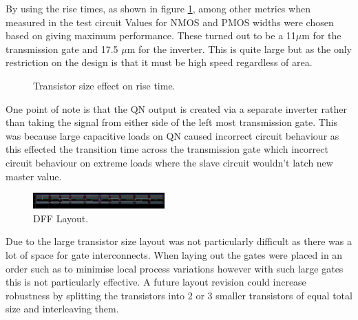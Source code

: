 By using the rise times, as shown in figure \ref{fig:DDFNW}, among other metrics when measured in the test circuit Values for NMOS and PMOS widths were chosen based on giving maximum performance. These turned out to be a 11$\mu$m for the transmission gate and 17.5 $\mu$m for the inverter. This is quite large but as the only restriction on the design is that it must be high speed regardless of area.

\begin{figure}[h]
\centering
{}
\caption{Transistor size effect on rise time.}
\label{fig:DDFNW}
\end{figure}

One point of note is that the QN output is created via a separate inverter rather than taking the signal from either side of the left most transmission gate. This was because large capacitive loads on QN caused incorrect circuit behaviour as this effected the transition time across the transmission gate which incorrect circuit behaviour on extreme loads where the slave circuit wouldn't latch new master value.

\begin{figure}[h]  
\centering
   \includegraphics[width=0.45\textwidth]{Figures/DFFLayout.png}
\caption{DFF Layout.}
\label {fig:DFFLayout}
\end{figure}

Due to the large transistor size layout was not particularly difficult as there was a lot of space for gate interconnects. When laying out the gates were placed in an order such as to minimise local process variations however with such large gates this is not particularly effective. A future layout revision could increase robustness by splitting the transistors into 2 or 3 smaller transistors of equal total size and interleaving them.

